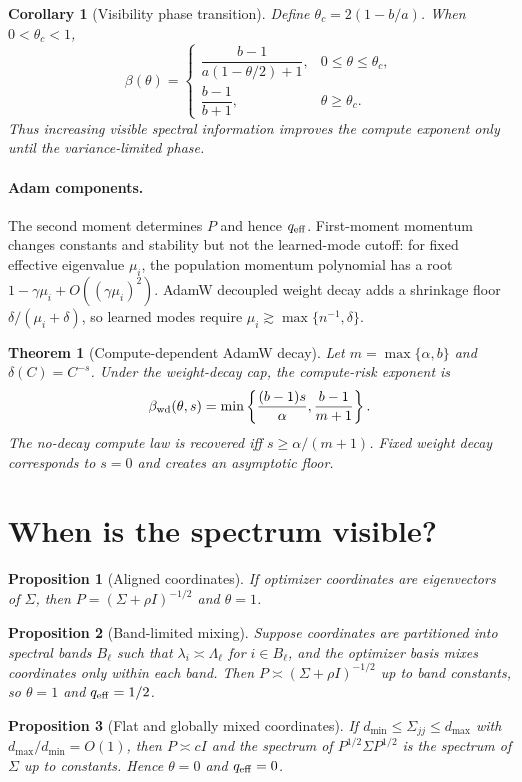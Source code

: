 \documentclass{article}
\newtheorem{theorem}{Theorem}
\newtheorem{proposition}{Proposition}
\newtheorem{corollary}{Corollary}
\begin{document}
\begin{corollary}[Visibility phase transition]
\label{cor:phase}
Define $\theta_c=2(1-b/a)$.  When $0<\theta_c<1$,
\[
    \beta(\theta)=
    \begin{cases}
    \dfrac{b-1}{a(1-\theta/2)+1}, & 0\le\theta\le\theta_c,\\[8pt]
    \dfrac{b-1}{b+1}, & \theta\ge\theta_c.
    \end{cases}
\]
Thus increasing visible spectral information improves the compute exponent only until the variance-limited phase.
\end{corollary}

\paragraph{Adam components.} The second moment determines $P$ and hence $q_{\rm eff}$.  First-moment momentum changes constants and stability but not the learned-mode cutoff: for fixed effective eigenvalue $\mu_i$, the population momentum polynomial has a root $1-\gamma\mu_i+O((\gamma\mu_i)^2)$.  AdamW decoupled weight decay adds a shrinkage floor $\delta/(\mu_i+\delta)$, so learned modes require $\mu_i\gtrsim\max\{n^{-1},\delta\}$.

\begin{theorem}[Compute-dependent AdamW decay]
\label{thm:adamw}
Let $m=\max\{\alpha,b\}$ and $\delta(C)=C^{-s}$.  Under the weight-decay cap, the compute-risk exponent is
\[
    \beta_{\rm wd}(\theta,s)=
    \min\left\{\frac{(b-1)s}{\alpha},\frac{b-1}{m+1}\right\}.
\]
The no-decay compute law is recovered iff $s\ge\alpha/(m+1)$.  Fixed weight decay corresponds to $s=0$ and creates an asymptotic floor.
\end{theorem}

\section{When is the spectrum visible?}
\begin{proposition}[Aligned coordinates]
If optimizer coordinates are eigenvectors of $\Sigma$, then $P=(\Sigma+\rho I)^{-1/2}$ and $\theta=1$.
\end{proposition}
\begin{proposition}[Band-limited mixing]
Suppose coordinates are partitioned into spectral bands $B_\ell$ such that $\lambda_i\asymp\Lambda_\ell$ for $i\in B_\ell$, and the optimizer basis mixes coordinates only within each band.  Then $P\asymp(\Sigma+\rho I)^{-1/2}$ up to band constants, so $\theta=1$ and $q_{\rm eff}=1/2$.
\end{proposition}
\begin{proposition}[Flat and globally mixed coordinates]
If $d_{\min}\le\Sigma_{jj}\le d_{\max}$ with $d_{\max}/d_{\min}=O(1)$, then $P\asymp cI$ and the spectrum of $P^{1/2}\Sigma P^{1/2}$ is the spectrum of $\Sigma$ up to constants.  Hence $\theta=0$ and $q_{\rm eff}=0$.
\end{proposition}
\end{document}
